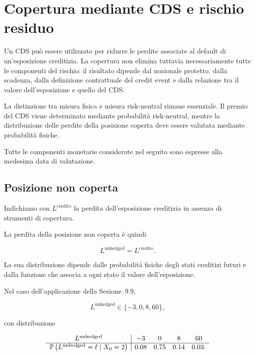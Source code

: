 \section{Copertura mediante CDS e rischio residuo}

\label{sec:cap9-copertura-cds}

Un CDS pu\`{o} essere utilizzato per ridurre le perdite associate al
default di un'esposizione creditizia. La copertura non elimina tuttavia
necessariamente tutte le componenti del rischio: il risultato dipende
dal nozionale protetto, dalla scadenza, dalla definizione contrattuale
del credit event e dalla relazione tra il valore dell'esposizione e
quello del CDS.

La distinzione tra misura fisica e misura risk-neutral rimane
essenziale. Il premio del CDS viene determinato mediante probabilit\`{a}
risk-neutral, mentre la distribuzione delle perdite della posizione
coperta deve essere valutata mediante probabilit\`{a} fisiche.

Tutte le componenti monetarie considerate nel seguito sono espresse
alla medesima data di valutazione.

\subsection{Posizione non coperta}

\label{subsec:cap9-posizione-non-coperta}

Indichiamo con $L^{\mathrm{credito}}$ la perdita dell'esposizione
creditizia in assenza di strumenti di copertura.

La perdita della posizione non coperta \`{e} quindi

\[
L^{\mathrm{unhedged}}
=
L^{\mathrm{credito}}.
\]

La sua distribuzione dipende dalle probabilit\`{a} fisiche degli stati
creditizi futuri e dalla funzione che associa a ogni stato il valore
dell'esposizione.

Nel caso dell'applicazione della Sezione~9.9,

\[
L^{\mathrm{unhedged}}
\in
\{-3,0,8,60\},
\]

con distribuzione

\[
\begin{array}{c|cccc}
L^{\mathrm{unhedged}}
&
-3
&
0
&
8
&
60
\\
\hline
\mathbb{P}
\left(
L^{\mathrm{unhedged}}=\ell
\mid X_0=2
\right)
&
0.08
&
0.75
&
0.14
&
0.03.
\end{array}
\]

